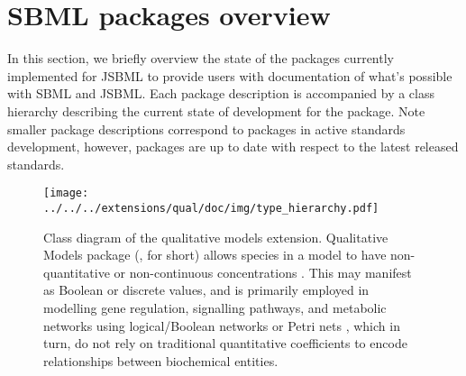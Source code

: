 
\section{SBML packages overview}
\label{sec:extensionsOverview}

In this section, we briefly overview the state of the \SBMLthree packages currently
implemented for JSBML to provide users with documentation of what's possible with SBML and JSBML.
Each package description is accompanied by a 
class hierarchy describing the current state of development for the
package. Note smaller package descriptions correspond to packages in
active standards development, however, packages are up to date
with respect to the latest released standards.

\begin{figure}[hb]
 \centering
 \vspace*{2ex}
 \texttt{[image: ../../../extensions/qual/doc/img/type\_hierarchy.pdf]}
 \caption[Class diagram of the qualitative models extension]{Class diagram of the qualitative models extension. Qualitative Models package (, for short) allows species in a model to 
have non-quantitative or non-continuous concentrations \cite{Chaouiya2013}. 
This may manifest as Boolean or discrete values, and is primarily employed in 
modelling gene regulation, signalling pathways, and metabolic networks using 
logical/Boolean networks \cite{shmulevich2002} or Petri nets 
\cite{breitling2008}, which in turn, do not rely on traditional quantitative
coefficients to encode relationships between biochemical entities.}
 \label{fig:qual}
\end{figure}

